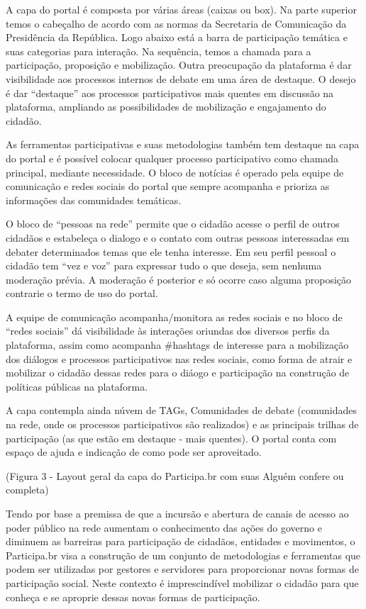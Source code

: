 \documentclass{article}
\begin{document}
A capa do portal é composta por várias áreas (caixas ou box). Na parte superior
temos o cabeçalho de acordo com as normas da Secretaria de Comunicação da
Presidência da República. Logo abaixo está a barra de participação temática e
suas categorias para interação. Na sequência, temos a chamada para a
participação, proposição e mobilização. Outra preocupação da plataforma é dar
visibilidade aos processos internos de debate em uma área de destaque. O desejo
é dar ``destaque'' aos processos participativos mais quentes em discussão na
plataforma, ampliando as possibilidades de mobilização e engajamento do
cidadão.

As ferramentas participativas e suas metodologias também tem destaque na capa
do portal e é possível colocar qualquer processo participativo como chamada
principal, mediante necessidade. O bloco de notícias é operado pela equipe de
comunicação e redes sociais do portal que sempre acompanha e prioriza as
informações das comunidades temáticas.

O bloco de ``pessoas na rede'' permite que o cidadão acesse o perfil de outros
cidadãos e estabeleça o dialogo e o contato com outras pessoas interessadas em
debater determinados temas que ele tenha interesse. Em seu perfil pessoal o
cidadão tem ``vez e voz'' para expressar tudo o que deseja, sem nenhuma moderação
prévia. A moderação é posterior e só ocorre caso alguma proposição contrarie o
termo de uso do portal.

A equipe de comunicação acompanha/monitora as redes sociais e no bloco de
``redes sociais''  dá visibilidade às interações oriundas dos diversos perfis da
plataforma, assim como acompanha \#hashtags de interesse para a mobilização dos
diálogos e processos participativos nas redes sociais, como forma de atrair e
mobilizar o cidadão dessas redes para o diáogo e participação na construção de
políticas públicas na plataforma.

A capa contempla ainda núvem de TAGs, Comunidades de debate (comunidades na
rede, onde os processos participativos são realizados) e as principais trilhas
de participação (as que estão em destaque - mais quentes). O portal conta com
espaço de ajuda e indicação de como pode ser aproveitado.
 
(Figura 3 - Layout geral da capa do Participa.br com suas Alguém confere ou completa)

Tendo por base a premissa de que a incursão e abertura de canais de acesso ao
poder público na rede aumentam o conhecimento das ações do governo e diminuem
as barreiras para participação de cidadãos, entidades e movimentos, o
Participa.br visa a construção de um conjunto de metodologias e ferramentas que
podem ser utilizadas por gestores e servidores para proporcionar novas formas
de participação social. Neste contexto é imprescindível mobilizar o cidadão
para que conheça e se aproprie dessas novas formas de participação.
\end{document}
